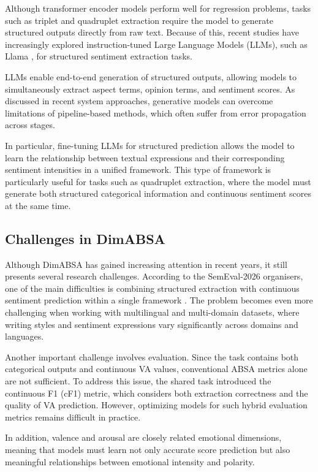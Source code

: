 \documentclass{article}
\begin{document}
Although transformer encoder models perform well for regression problems, tasks such as triplet and quadruplet extraction require the model to generate structured outputs directly from raw text. Because of this, recent studies have increasingly explored instruction-tuned Large Language Models (LLMs), such as Llama \cite{touvron2023llama}, for structured sentiment extraction tasks.

LLMs enable end-to-end generation of structured outputs, allowing models to simultaneously extract aspect terms, opinion terms, and sentiment scores. As discussed in recent system approaches, generative models can overcome limitations of pipeline-based methods, which often suffer from error propagation across stages.

In particular, fine-tuning LLMs for structured prediction allows the model to learn the relationship between textual expressions and their corresponding sentiment intensities in a unified framework. This type of framework is particularly useful for tasks such as quadruplet extraction, where the model must generate both structured categorical information and continuous sentiment scores at the same time.

\subsection{Challenges in DimABSA}

Although DimABSA has gained increasing attention in recent years, it still presents several research challenges. According to the SemEval-2026 organisers, one of the main difficulties is combining structured extraction with continuous sentiment prediction within a single framework \cite{yu2026dimabsa}. The problem becomes even more challenging when working with multilingual and multi-domain datasets, where writing styles and sentiment expressions vary significantly across domains and languages.

Another important challenge involves evaluation. Since the task contains both categorical outputs and continuous VA values, conventional ABSA metrics alone are not sufficient. To address this issue, the shared task introduced the continuous F1 (cF1) metric, which considers both extraction correctness and the quality of VA prediction. However, optimizing models for such hybrid evaluation metrics remains difficult in practice.

In addition, valence and arousal are closely related emotional dimensions, meaning that models must learn not only accurate score prediction but also meaningful relationships between emotional intensity and polarity.
\end{document}
